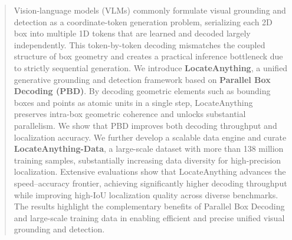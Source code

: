 \begin{abstract}
Vision-language models (VLMs) commonly formulate visual grounding and detection as a coordinate-token generation problem, serializing each 2D box into multiple 1D tokens that are learned and decoded largely independently. This token-by-token decoding mismatches the coupled structure of box geometry and creates a practical inference bottleneck due to strictly sequential generation. We introduce \textbf{LocateAnything}, a unified generative grounding and detection framework based on \textbf{Parallel Box Decoding (PBD)}. By decoding geometric elements such as bounding boxes and points as atomic units in a single step, LocateAnything preserves intra-box geometric coherence and unlocks substantial parallelism. We show that PBD improves both decoding throughput and localization accuracy. We further develop a scalable data engine and curate \textbf{LocateAnything-Data}, a large-scale dataset with more than 138 million training samples, substantially increasing data diversity for high-precision localization. Extensive evaluations show that LocateAnything advances the speed–accuracy frontier, achieving significantly higher decoding throughput while improving high-IoU localization quality across diverse benchmarks. The results highlight the complementary benefits of Parallel Box Decoding and large-scale training data in enabling efficient and precise unified visual grounding and detection.
\vspace{-1mm}
\end{abstract}

